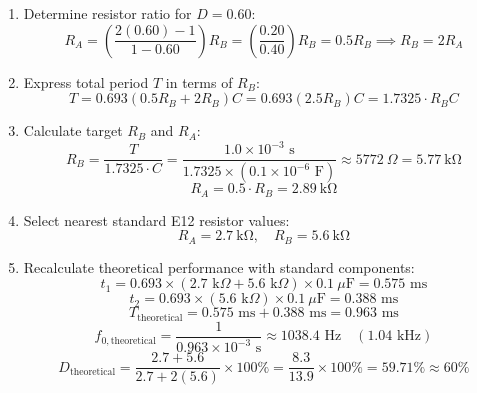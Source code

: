 \begin{enumerate}
	\item Determine resistor ratio for $D = 0.60$:
	\begin{equation}
		R_A = \left( \frac{2(0.60) - 1}{1 - 0.60} \right) R_B = \left( \frac{0.20}{0.40} \right) R_B = 0.5 R_B \implies R_B = 2 R_A
	\end{equation}
	
	\item Express total period $T$ in terms of $R_B$:
	\begin{equation}
		T = 0.693 (0.5 R_B + 2 R_B) C = 0.693 (2.5 R_B) C = 1.7325 \cdot R_B C
	\end{equation}
	
	\item Calculate target $R_B$ and $R_A$:
	\begin{equation}
		R_B = \frac{T}{1.7325 \cdot C} = \frac{1.0 \times 10^{-3}\text{ s}}{1.7325 \times (0.1 \times 10^{-6}\text{ F})} \approx 5772\ \Omega = \SI{5.77}{\kilo\ohm}
	\end{equation}
	\begin{equation}
		R_A = 0.5 \cdot R_B = \SI{2.89}{\kilo\ohm}
	\end{equation}
	
	\item Select nearest standard E12 resistor values:
	\begin{equation}
		R_A = \SI{2.7}{\kilo\ohm}, \quad R_B = \SI{5.6}{\kilo\ohm}
	\end{equation}
	
	\item Recalculate theoretical performance with standard components:
	\begin{equation}
		t_1 = 0.693 \times (2.7\text{ k}\Omega + 5.6\text{ k}\Omega) \times 0.1\ \mu\text{F} = 0.575\text{ ms}
	\end{equation}
	\begin{equation}
		t_2 = 0.693 \times (5.6\text{ k}\Omega) \times 0.1\ \mu\text{F} = 0.388\text{ ms}
	\end{equation}
	\begin{equation}
		T_{\text{theoretical}} = 0.575\text{ ms} + 0.388\text{ ms} = 0.963\text{ ms}
	\end{equation}
	\begin{equation}
		f_{0,\text{theoretical}} = \frac{1}{0.963 \times 10^{-3}\text{ s}} \approx 1038.4\text{ Hz} \quad (1.04\text{ kHz})
	\end{equation}
	\begin{equation}
		D_{\text{theoretical}} = \frac{2.7 + 5.6}{2.7 + 2(5.6)} \times 100\% = \frac{8.3}{13.9} \times 100\% = 59.71\% \approx 60\%
	\end{equation}
\end{enumerate}

